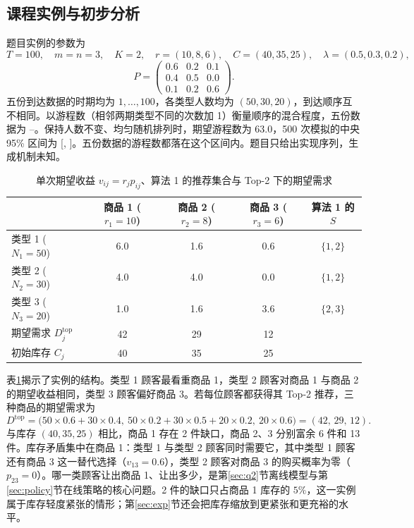 \subsection{课程实例与初步分析}\label{sec:instance}
题目实例\cite{assignment}的参数为
\begin{equation}
T=100,\quad m=n=3,\quad K=2,\quad r=(10,8,6),\quad C=(40,35,25),\quad \lambda=(0.5,0.3,0.2),
\label{eq:instance}
\end{equation}
\begin{equation}
P=\begin{pmatrix}0.6&0.2&0.1\\0.4&0.5&0.0\\0.1&0.2&0.6\end{pmatrix}.
\end{equation}
五份到达数据的时期均为 $1,\ldots,100$，各类型人数均为 $(50,30,20)$，到达顺序互不相同。以游程数（相邻两期类型不同的次数加 1）衡量顺序的混合程度，五份数据为 \RunsMin--\RunsMax。保持人数不变、均匀随机排列时，期望游程数为 $63.0$，500 次模拟的中央 95\% 区间为 [\RunsLo, \RunsHi]。五份数据的游程数都落在这个区间内。题目只给出实现序列，生成机制未知。

\begin{table}[htbp]
\centering\small
\caption{单次期望收益 $v_{ij}=r_jp_{ij}$、算法 1 的推荐集合与 Top-2 下的期望需求}\label{tab:instance}
\begin{tabular}{lcccc}
\toprule
 & 商品 1 ($r_1=10$) & 商品 2 ($r_2=8$) & 商品 3 ($r_3=6$) & 算法 1 的 $S$\\
\midrule
类型 1 ($N_1=50$) & 6.0 & 1.6 & 0.6 & $\{1,2\}$\\
类型 2 ($N_2=30$) & 4.0 & 4.0 & 0.0 & $\{1,2\}$\\
类型 3 ($N_3=20$) & 1.0 & 1.6 & 3.6 & $\{2,3\}$\\
\midrule
期望需求 $D^{\mathrm{top}}_j$ & 42 & 29 & 12 & \\
初始库存 $C_j$ & 40 & 35 & 25 & \\
\bottomrule
\end{tabular}
\end{table}

表\ref{tab:instance}揭示了实例的结构。类型 1 顾客最看重商品 1，类型 2 顾客对商品 1 与商品 2 的期望收益相同，类型 3 顾客偏好商品 3。若每位顾客都获得其 Top-2 推荐，三种商品的期望需求为
\begin{equation}
D^{\mathrm{top}}=\bigl(50\times0.6+30\times0.4,\ 50\times0.2+30\times0.5+20\times0.2,\ 20\times0.6\bigr)=(42,\,29,\,12).
\end{equation}
与库存 $(40,35,25)$ 相比，商品 1 存在 2 件缺口，商品 2、3 分别富余 6 件和 13 件。库存矛盾集中在商品 1：类型 1 与类型 2 顾客同时需要它，其中类型 1 顾客还有商品 3 这一替代选择（$v_{13}=0.6$），类型 2 顾客对商品 3 的购买概率为零（$p_{23}=0$）。哪一类顾客让出商品 1、让出多少，是第\ref{sec:q2}节离线模型与第\ref{sec:policy}节在线策略的核心问题。2 件的缺口只占商品 1 库存的 $5\%$，这一实例属于库存轻度紧张的情形；第\ref{sec:exp}节还会把库存缩放到更紧张和更充裕的水平。
